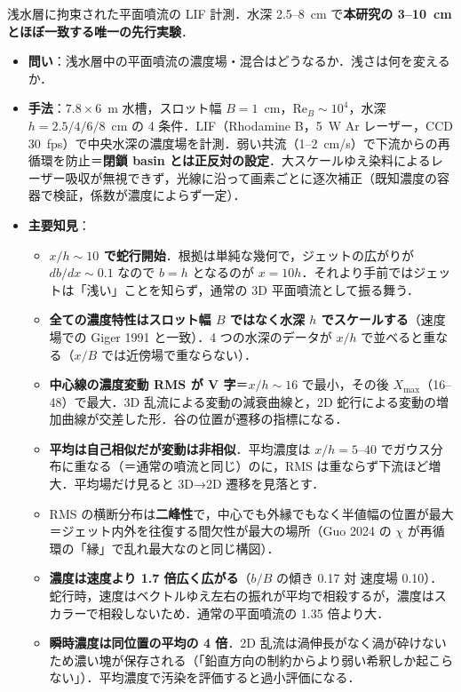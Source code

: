 \documentclass[11pt]{jsarticle}
\newcommand{\litref}[1]{{\large\bfseries\color{citecolor}#1}}
\begin{document}
\noindent\litref{Chen \& Jirka (1999)}\quad 浅水層に拘束された平面噴流の LIF 計測．水深 2.5--8~cm で\textbf{本研究の 3--10~cm とほぼ一致する唯一の先行実験}．
\begin{itemize}
  \item \textbf{問い}：浅水層中の平面噴流の濃度場・混合はどうなるか．浅さは何を変えるか．
  \item \textbf{手法}：$7.8 \times 6$~m 水槽，スロット幅 $B = 1$~cm，$\mathrm{Re}_B \sim 10^4$，水深 $h = 2.5/4/6/8$~cm の 4 条件．LIF（Rhodamine B，5~W Ar レーザー，CCD 30~fps）で中央水深の濃度場を計測．弱い共流（1--2~cm/s）で下流からの再循環を防止＝\textbf{閉鎖 basin とは正反対の設定}．大スケールゆえ染料によるレーザー吸収が無視できず，光線に沿って画素ごとに逐次補正（既知濃度の容器で検証，係数が濃度によらず一定）．
  \item \textbf{主要知見}：
  \begin{itemize}
    \item \textbf{$x/h \sim 10$ で蛇行開始}．根拠は単純な幾何で，ジェットの広がりが $db/dx \sim 0.1$ なので $b = h$ となるのが $x = 10h$．それより手前ではジェットは「浅い」ことを知らず，通常の 3D 平面噴流として振る舞う．
    \item \textbf{全ての濃度特性はスロット幅 $B$ ではなく水深 $h$ でスケールする}（速度場での Giger 1991 と一致）．4 つの水深のデータが $x/h$ で並べると重なる（$x/B$ では近傍場で重ならない）．
    \item \textbf{中心線の濃度変動 RMS が V 字}＝$x/h \sim 16$ で最小，その後 $X_\mathrm{max}$（16--48）で最大．3D 乱流による変動の減衰曲線と，2D 蛇行による変動の増加曲線が交差した形．谷の位置が遷移の指標になる．
    \item \textbf{平均は自己相似だが変動は非相似}．平均濃度は $x/h = 5$--$40$ でガウス分布に重なる（＝通常の噴流と同じ）のに，RMS は重ならず下流ほど増大．平均場だけ見ると 3D→2D 遷移を見落とす．
    \item RMS の横断分布は\textbf{二峰性}で，中心でも外縁でもなく半値幅の位置が最大＝ジェット内外を往復する間欠性が最大の場所（Guo 2024 の $\chi$ が再循環の「縁」で乱れ最大なのと同じ構図）．
    \item \textbf{濃度は速度より 1.7 倍広く広がる}（$b/B$ の傾き 0.17 対 速度場 0.10）．蛇行時，速度はベクトルゆえ左右の振れが平均で相殺するが，濃度はスカラーで相殺しないため．通常の平面噴流の 1.35 倍より大．
    \item \textbf{瞬時濃度は同位置の平均の 4 倍}．2D 乱流は渦伸長がなく渦が砕けないため濃い塊が保存される（「鉛直方向の制約からより弱い希釈しか起こらない」）．平均濃度で汚染を評価すると過小評価になる．

\end{itemize}
\end{itemize}
\end{document}

